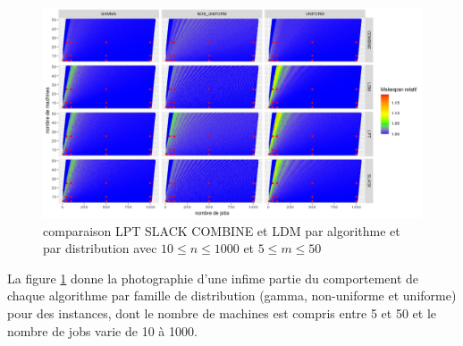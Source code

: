 \documentclass[a4paper,12pt]{report}
\theoremstyle{plain}				%
\theoremstyle{definition}				%
\begin{document}
\begin{figure}
{\centering
\includegraphics[width=\columnwidth]{9_resultatComparaisonAlgoDistributions.jpeg}
\caption{comparaison LPT SLACK COMBINE et LDM par algorithme et par distribution avec 
  $10\leq n \leq 1000$ et $5\leq m \leq 50$}
\label{fig:resultatComparaisonAlgoDistributions}
\par}
\end{figure}

La figure \ref{fig:resultatComparaisonAlgoDistributions} donne la photographie d'une infime partie 
  du comportement de chaque algorithme par famille de distribution 
  (gamma, non-uniforme et uniforme) 
  pour des instances, dont le nombre de machines est compris entre 5 et 50 
  et le nombre de jobs varie de 10 à 1000. 
\end{document}
